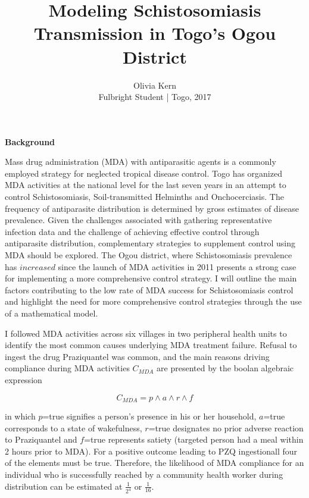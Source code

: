 \documentclass[12pt]{article}
\begin{document}
 

 
 
\title{Modeling Schistosomiasis Transmission in Togo's Ogou District}
\author{Olivia Kern\\
Fulbright Student | Togo, 2017} 
 
\maketitle \textbf{Background}
\linebreak

Mass drug administration (MDA) with antiparasitic agents is a commonly employed strategy for neglected tropical disease control. Togo has organized MDA activities at the national level for the last seven years in an attempt to control Schistosomiasis, Soil-transmitted Helminths and Onchocerciasis. The frequency of antiparasite distribution is determined by gross estimates of disease prevalence. Given the challenges associated with gathering representative infection data and the challenge of achieving effective control through antiparasite distribution, complementary strategies to supplement control using MDA should be explored. The Ogou district, where Schistosomiasis  prevalence has $increased$ since the launch of MDA activities in 2011 presents a strong case for implementing a more comprehensive control strategy. I will outline the main factors contributing to the low rate of MDA success for Schistosomiasis control and highlight the need for more comprehensive control strategies through the use of a mathematical model. 
\linebreak

I followed MDA activities across six villages in two peripheral health units to identify the most common causes underlying MDA treatment failure. Refusal to ingest the drug Praziquantel was common, and the main reasons driving compliance during MDA activities $C_{MDA}$ are presented by the boolan algebraic expression

\begin{equation}\label{eq:probMDA}
 C_{MDA} = p \wedge a \wedge r \wedge f 
\end{equation}

in which $p$=true signifies a person's presence in his or her household, $a$=true corresponds to a state of wakefulness, $r$=true designates no prior adverse reaction to Praziquantel and $f$=true represents satiety (targeted person had a meal within 2 hours prior to MDA). For a positive outcome leading to PZQ ingestionall four of the elements must be true. Therefore, the likelihood of  MDA compliance for an individual who is successfully reached by a community health worker during distribution can be estimated at $\frac{1}{2^4}$ or $\frac{1}{16}$.
\linebreak
\end{document}
